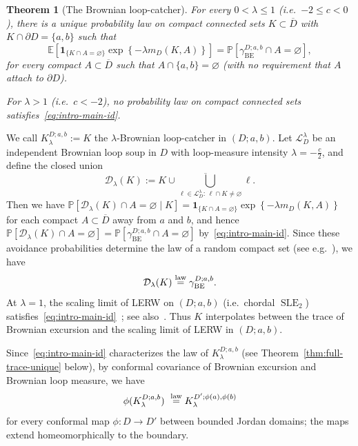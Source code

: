 \documentclass[11pt]{article}
\numberwithin{equation}{section}
\newcommand{\cL}{\mathcal{L}}
\newcommand{\E}{\mathbb{E}}
\newcommand{\1}{\mathbf{1}}
\newcommand{\BE}{\mathrm{BE}}
\DeclareMathOperator{\SLE}{SLE}
\newtheorem{theorem}{Theorem}[section]
\newcommand\ol[1]{\overline{#1}}
\newcommand{\one}{\mathbf 1}
\newcommand{\Prob}{\mathbb P}
\begin{document}
\begin{theorem}[The Brownian loop-catcher]\label{thm:main}
For every \(0<\lambda\le 1\) (i.e.~\(-2\le c<0\)), there is a
unique probability law on compact connected sets
\(K\subset\overline D\) with
\(K\cap\partial D=\{a,b\}\) such that
\begin{equation}\label{eq:intro-main-id}
        \E\left[\one_{\{K\cap A=\varnothing\}}
        \exp\left\{-\lambda m_D(K,A)\right\}\right]
        =\Prob\left[\gamma_{\BE}^{D;a,b}\cap A=\varnothing\right],
\end{equation}
for every compact \(A\subset\overline D\) such that $A\cap\{a,b\}=\varnothing$ (with no requirement that \(A\) attach to \(\partial D\)).

For \(\lambda>1\) (i.e.~\(c<-2\)), no probability law on compact
connected sets satisfies~\eqref{eq:intro-main-id}.
\end{theorem}

We call \(K_\lambda^{D;a,b}:=K\) the \(\lambda\)-Brownian loop-catcher in
\((D;a,b)\).
Let
\(\cL_D^\lambda\) be an independent Brownian loop soup in \(D\) with
loop-measure intensity $\lambda=-\frac{c}{2}$, and define the closed union
\begin{equation*}
        \mathcal D_\lambda(K):=\ol{K\cup
        \bigcup_{\ell\in\cL_D^\lambda:\,\ell\cap K\ne\varnothing}\ell}.
\end{equation*}
Then we have $\Prob[\mathcal D_\lambda(K)\cap A=\varnothing\mid K]=\one_{\{K\cap A=\varnothing\}}\exp\left\{-\lambda m_D(K,A)\right\}$ for each compact $A\subset\overline D$ away from $a$ and $b$,
and hence \(\Prob[\mathcal D_\lambda(K)\cap A=\varnothing]=\Prob[\gamma_{\BE}^{D;a,b}\cap A=\varnothing]\) by~\eqref{eq:intro-main-id}. Since these avoidance probabilities determine the law of a random compact set (see e.g.~\cite[Section~1.1]{Molchanov2017}), we have
\begin{equation}\label{eq:decoration}
\mathcal D_\lambda(K)\overset{\rm law}=\gamma_{\BE}^{D;a,b}.
\end{equation}
At \(\lambda=1\), the scaling limit of LERW on $(D;a,b)$ (i.e.~chordal \(\SLE_2\)) satisfies~\eqref{eq:intro-main-id}~\cite{SS18}; see also~\cite{Ambrosio2020,BS26}.
Thus \(K\) interpolates between the trace of Brownian excursion and the scaling limit of LERW in \((D;a,b)\).

Since~\eqref{eq:intro-main-id} characterizes the law of $K_\lambda^{D;a,b}$ (see Theorem~\ref{thm:full-trace-unique} below), by conformal covariance of Brownian excursion and Brownian loop measure, we have
\[
 \phi(K_\lambda^{D;a,b})\ \overset{\rm law}=
 K_\lambda^{D';\phi(a),\phi(b)}
\]
for every conformal map \(\phi:D\to D'\) between bounded Jordan domains;
the maps extend homeomorphically to the boundary.
\end{document}
